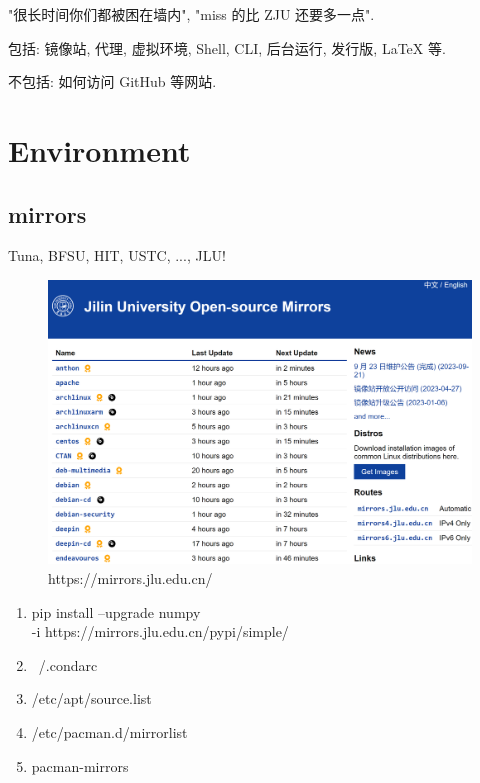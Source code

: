 \documentclass[a4paper]{article}
\begin{document}
"很长时间你们都被困在墙内", "miss 的比 ZJU 还要多一点".

包括: 镜像站, 代理, 虚拟环境, Shell, CLI, 后台运行, 发行版, LaTeX 等.

不包括: 如何访问 GitHub 等网站.

\section{\LARGE Environment}

\subsection{\LARGE mirrors}

Tuna, BFSU, HIT, USTC, ..., JLU!

\begin{figure}[hb]
    \centering
    \includegraphics[height=.4\textheight]{figures/mirror.png}
    \caption{https://mirrors.jlu.edu.cn/}
\end{figure}

\begin{enumerate}[leftmargin=2cm,  itemindent=1cm]
    \tt
    \item pip install --upgrade numpy \\ -i https://mirrors.jlu.edu.cn/pypi/simple/
    \item ~/.condarc
    \item /etc/apt/source.list
    \item /etc/pacman.d/mirrorlist
    \item pacman-mirrors
\end{enumerate}
\end{document}
